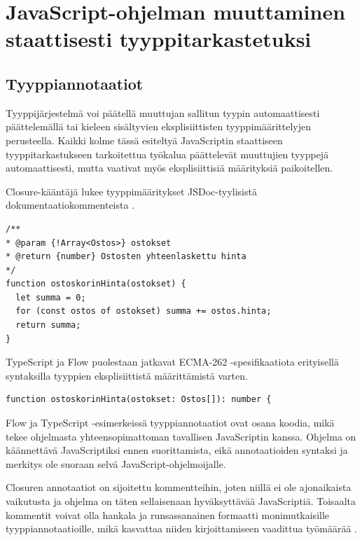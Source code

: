 \chapter{JavaScript-ohjelman muuttaminen staattisesti tyyppitarkastetuksi}

\section{Tyyppiannotaatiot}

Tyyppijärjestelmä voi päätellä muuttujan sallitun tyypin automaattisesti
päättelemällä tai kieleen sisältyvien eksplisiittisten tyyppimäärittelyjen
perusteella. Kaikki kolme tässä esiteltyä JavaScriptin staattiseen
tyyppitarkastukseen tarkoitettua työkalua päättelevät muuttujien tyyppejä automaattisesti, mutta vaativat
myös eksplisiittisiä määrityksiä paikoitellen. 

\begin{minipage}{\linewidth}
Closure-kääntäjä lukee
tyyppimääritykset JSDoc-tyylisistä dokumentaatiokommenteista \cite{annotatingJSforClosure}.
\begin{lstlisting}[caption={Esimerkki Closure-annotaatiosta funktiolle},label={lst:ostoskorin_hinta_clojure}]
/**
* @param {!Array<Ostos>} ostokset
* @return {number} Ostosten yhteenlaskettu hinta
*/
function ostoskorinHinta(ostokset) {
  let summa = 0;
  for (const ostos of ostokset) summa += ostos.hinta;
  return summa;
}
\end{lstlisting}
\end{minipage}
TypeScript ja Flow puolestaan jatkavat ECMA-262 -spesifikaatiota erityisellä syntaksilla
tyyppien eksplisiittistä määrittämistä varten. 

\begin{minipage}{\linewidth}
\begin{lstlisting}[caption={Esimerkki Flow tai TypeScript annotaatiosta funktiolle},label={lst:ostoskorin_hinta_flow}]
function ostoskorinHinta(ostokset: Ostos[]): number {
\end{lstlisting}
\end{minipage}

Flow ja TypeScript -esimerkeissä tyyppiannotaatiot ovat osana koodia, mikä
tekee ohjelmasta yhteensopimattoman tavallisen JavaScriptin kanssa. Ohjelma
on käännettävä JavaScriptiksi ennen suorittamista, eikä annotaatioiden
syntaksi ja merkitys ole suoraan selvä JavaScript-ohjelmoijalle. 

Closuren annotaatiot on sijoitettu kommentteihin, joten niillä ei ole
ajonaikaista vaikutusta ja ohjelma on täten sellaisenaan hyväksyttävää
JavaScriptiä. Toisaalta kommentit voivat olla hankala ja runsassanainen
formaatti monimutkaisille tyyppiannotaatioille, mikä kasvattaa niiden
kirjoittamiseen vaadittua työmäärää \cite{TypeScriptSpec}\cite{TypeScriptatBuild}.

